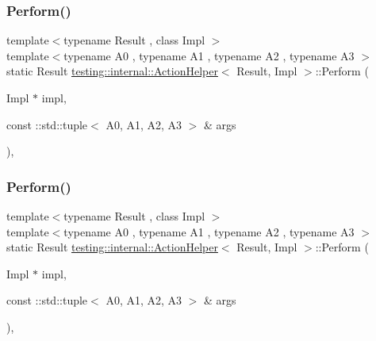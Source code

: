 \mbox{\label{classtesting_1_1internal_1_1_action_helper_abeefd0482a2e8349cbfd3223eeda503d}} 
\subsubsection{\texorpdfstring{Perform()}{Perform()}\hspace{0.1cm}{\footnotesize\ttfamily [9/33]}}
{\footnotesize\ttfamily template$<$typename Result , class Impl $>$ \\
template$<$typename A0 , typename A1 , typename A2 , typename A3 $>$ \\
static Result \mbox{\hyperlink{classtesting_1_1internal_1_1_action_helper}{testing\+::internal\+::\+Action\+Helper}}$<$ Result, Impl $>$\+::Perform (\begin{DoxyParamCaption}\item[{Impl $\ast$}]{impl,  }\item[{const \+::std\+::tuple$<$ A0, A1, A2, A3 $>$ \&}]{args }\end{DoxyParamCaption})\hspace{0.3cm}{\ttfamily [inline]}, {\ttfamily [static]}}

\mbox{\label{classtesting_1_1internal_1_1_action_helper_abeefd0482a2e8349cbfd3223eeda503d}} 
\subsubsection{\texorpdfstring{Perform()}{Perform()}\hspace{0.1cm}{\footnotesize\ttfamily [10/33]}}
{\footnotesize\ttfamily template$<$typename Result , class Impl $>$ \\
template$<$typename A0 , typename A1 , typename A2 , typename A3 $>$ \\
static Result \mbox{\hyperlink{classtesting_1_1internal_1_1_action_helper}{testing\+::internal\+::\+Action\+Helper}}$<$ Result, Impl $>$\+::Perform (\begin{DoxyParamCaption}\item[{Impl $\ast$}]{impl,  }\item[{const \+::std\+::tuple$<$ A0, A1, A2, A3 $>$ \&}]{args }\end{DoxyParamCaption})\hspace{0.3cm}{\ttfamily [inline]}, {\ttfamily [static]}}

